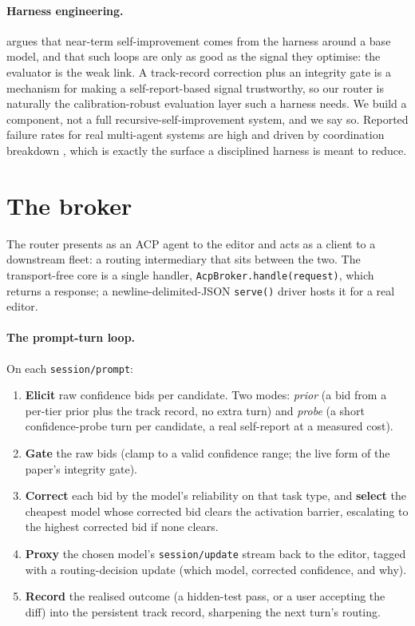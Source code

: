 \documentclass[11pt]{article}
\newcommand{\code}[1]{\texttt{#1}}
\begin{document}
\paragraph{Harness engineering.} \citet{weng2026harness} argues that near-term self-improvement comes from the harness around a base model, and that such loops are only as good as the signal they optimise: the evaluator is the weak link. A track-record correction plus an integrity gate is a mechanism for making a self-report-based signal trustworthy, so our router is naturally the calibration-robust evaluation layer such a harness needs. We build a component, not a full recursive-self-improvement system, and we say so. Reported failure rates for real multi-agent systems are high and driven by coordination breakdown \citep{cemri2025multiagent}, which is exactly the surface a disciplined harness is meant to reduce.

\section{The broker}

The router presents as an ACP agent to the editor and acts as a client to a downstream fleet: a routing intermediary that sits between the two. The transport-free core is a single handler, \code{AcpBroker.handle(request)}, which returns a response; a newline-delimited-JSON \code{serve()} driver hosts it for a real editor.

\paragraph{The prompt-turn loop.} On each \code{session/prompt}:
\begin{enumerate}\itemsep2pt
\item \textbf{Elicit} raw confidence bids per candidate. Two modes: \emph{prior} (a bid from a per-tier prior plus the track record, no extra turn) and \emph{probe} (a short confidence-probe turn per candidate, a real self-report at a measured cost).
\item \textbf{Gate} the raw bids (clamp to a valid confidence range; the live form of the paper's integrity gate).
\item \textbf{Correct} each bid by the model's reliability on that task type, and \textbf{select} the cheapest model whose corrected bid clears the activation barrier, escalating to the highest corrected bid if none clears.
\item \textbf{Proxy} the chosen model's \code{session/update} stream back to the editor, tagged with a routing-decision update (which model, corrected confidence, and why).
\item \textbf{Record} the realised outcome (a hidden-test pass, or a user accepting the diff) into the persistent track record, sharpening the next turn's routing.
\end{enumerate}
\end{document}
